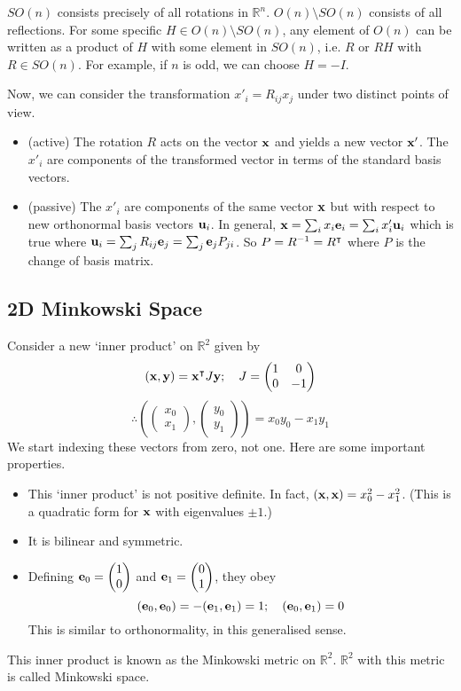 \documentclass{article}
\begin{document}
$SO(n)$ consists precisely of all rotations in $\mathbb R^n$. $O(n) \setminus SO(n)$ consists of all reflections. For some specific $H \in O(n) \setminus SO(n)$, any element of $O(n)$ can be written as a product of $H$ with some element in $SO(n)$, i.e. $R$ or $RH$ with $R \in SO(n)$. For example, if $n$ is odd, we can choose $H = -I$.

Now, we can consider the transformation $x'_i = R_{ij} x_j$ under two distinct points of view.
\begin{itemize}
	\item (active) The rotation $R$ acts on the vector $\vb x$ and yields a new vector $\vb x'$. The $x'_i$ are components of the transformed vector in terms of the standard basis vectors.
	\item (passive) The $x'_i$ are components of the same vector $\vb x$ but with respect to new orthonormal basis vectors $\vb u_i$. In general, $\vb x = \sum_i x_i \vb e_i = \sum_i x'_i \vb u_i$ which is true where $\vb u_i = \sum_j R_{ij} \vb e_j = \sum_j \vb e_j P_{ji}$. So $P = R^{-1} = R^\intercal$ where $P$ is the change of basis matrix.
\end{itemize}

\subsection{2D Minkowski Space}
Consider a new `inner product' on $\mathbb R^2$ given by
\[ (\vb x, \vb y) = \vb x^\intercal J \vb y;\quad J = \begin{pmatrix}
		1 & 0 \\ 0 & -1
	\end{pmatrix} \]
\[ \therefore \left( \begin{pmatrix}
			x_0 \\ x_1
		\end{pmatrix}, \begin{pmatrix}
			y_0 \\ y_1
		\end{pmatrix} \right) = x_0 y_0 - x_1 y_1 \]
We start indexing these vectors from zero, not one. Here are some important properties.
\begin{itemize}
	\item This `inner product' is not positive definite. In fact, $(\vb x, \vb x) = x_0^2 - x_1^2$. (This is a  quadratic form for $\vb x$ with eigenvalues $\pm 1$.)
	\item It is bilinear and symmetric.
	\item Defining $\vb e_0 = \begin{pmatrix}
			      1 \\ 0
		      \end{pmatrix}$ and $\vb e_1 = \begin{pmatrix}
			      0 \\ 1
		      \end{pmatrix}$, they obey
	      \[ (\vb e_0, \vb e_0) = -(\vb e_1, \vb e_1) = 1;\quad (\vb e_0, \vb e_1) = 0 \]
	      This is similar to orthonormality, in this generalised sense.
\end{itemize}
This inner product is known as the Minkowski metric on $\mathbb R^2$. $\mathbb R^2$ with this metric is called Minkowski space.
\end{document}
